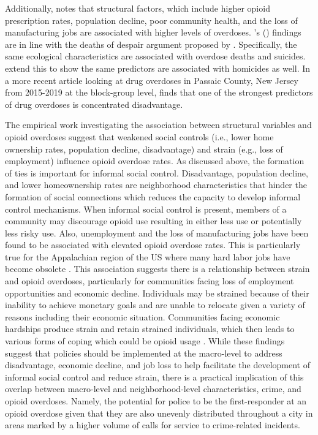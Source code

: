 Additionally, \textcite{feldmeyer_community_2022} notes that structural factors, which include higher opioid prescription rates, population decline, poor community health, and the loss of manufacturing jobs are associated with higher levels of overdoses. \citeauthor{feldmeyer_community_2022}'s (\citeyear{feldmeyer_community_2022}) findings are in line with the deaths of despair argument proposed by \textcite{case_rising_2015, case_mortality_2017}. Specifically, the same ecological characteristics are associated with overdose deaths and suicides. \textcite{feldmeyer_community_2022} extend this to show the same predictors are associated with homicides as well. In a more recent article looking at drug overdoses in Passaic County, New Jersey from 2015-2019 at the block-group level, \textcite{piza_drug_2023} finds that one of the strongest predictors of drug overdoses is concentrated disadvantage. 

The empirical work investigating the association between structural variables and opioid overdoses suggest that weakened social controls (i.e., lower home ownership rates, population decline, disadvantage) and strain (e.g., loss of employment) influence opioid overdose rates. As discussed above, the formation of ties is important for informal social control. Disadvantage, population decline, and lower homeownership rates are neighborhood characteristics that hinder the formation of social connections which reduces the capacity to develop informal control mechanisms. When informal social control is present, members of a community may discourage opioid use resulting in either less use or potentially less risky use. Also, unemployment and the loss of manufacturing jobs have been found to be associated with elevated opioid overdose rates. This is particularly true for the Appalachian region of the US where many hard labor jobs have become obsolete \parencite{mclean_theres_2016}. This association suggests there is a relationship between strain and opioid overdoses, particularly for communities facing loss of employment opportunities and economic decline. Individuals may be strained because of their inability to achieve monetary goals and are unable to relocate given a variety of reasons including their economic situation. Communities facing economic hardships produce strain and retain strained individuals, which then leads to various forms of coping which could be opioid usage \parencite{monnat_factors_2018, monnat_contributions_2019}. While these findings suggest that policies should be implemented at the macro-level to address disadvantage, economic decline, and job loss to help facilitate the development of informal social control and reduce strain, there is a practical implication of this overlap between macro-level and neighborhood-level characteristics, crime, and opioid overdoses. Namely, the potential for police to be the first-responder at an opioid overdose given that they are also unevenly distributed throughout a city in areas marked by a higher volume of calls for service to crime-related incidents.

